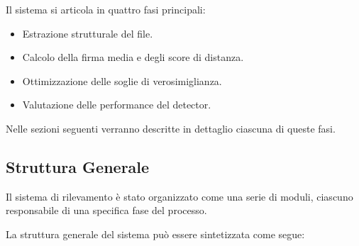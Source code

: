 \documentclass{report}
\begin{document}
Il sistema si articola in quattro fasi principali:
\begin{itemize}
    \item Estrazione strutturale del file.
    \item Calcolo della firma media e degli score di distanza.
    \item Ottimizzazione delle soglie di verosimiglianza.
    \item Valutazione delle performance del detector.
\end{itemize}

Nelle sezioni seguenti verranno descritte in dettaglio ciascuna di queste fasi.





\subsection{Struttura Generale}

Il sistema di rilevamento è stato organizzato come una serie di moduli, ciascuno responsabile di una specifica fase del processo.

La struttura generale del sistema può essere sintetizzata come segue:
\end{document}
